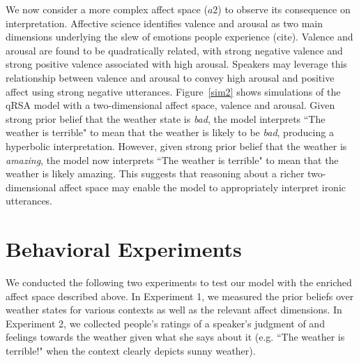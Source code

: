 \documentclass[10pt,letterpaper]{article}
\begin{document}
We now consider a more complex affect space ($a2$) to observe its consequence on interpretation. Affective science identifies valence and arousal as two main dimensions underlying the slew of emotions people experience (cite). Valence and arousal are found to be quadratically related, with strong negative valence and strong positive valence associated with high arousal. Speakers may leverage this relationship between valence and arousal to convey high arousal and positive affect using strong negative utterances. Figure~\ref{sim2} shows simulations of the qRSA model with a  two-dimensional affect space, valence and arousal. Given strong prior belief that the weather state is \emph{bad}, the model interprets ``The weather is terrible" to mean that the weather is likely to be \emph{bad}, producing a hyperbolic interpretation. However, given strong prior belief that the weather is \emph{amazing}, the model now interprets ``The weather is terrible" to mean that the weather is likely amazing. This suggests that reasoning about a richer two-dimensional affect space may enable the model to appropriately interpret ironic utterances. 



\section{Behavioral Experiments}
We conducted the following two experiments to test our model with the enriched affect space described above. In Experiment 1, we measured the prior beliefs over weather states for various contexts as well as the relevant affect dimensions. In Experiment 2, we collected people's ratings of a speaker's judgment of and feelings towards the weather given what she says about it (e.g. ``The weather is terrible!" when the context clearly depicts sunny weather).
\end{document}
